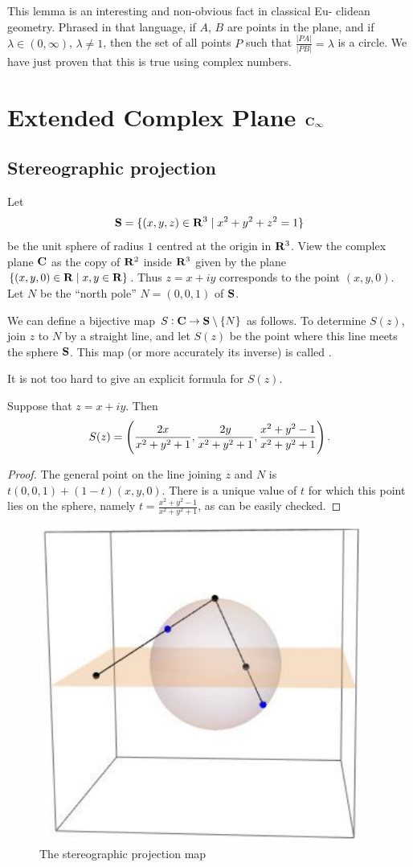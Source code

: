\begin{remark}
This lemma is an interesting and non-obvious fact in classical Eu-
clidean geometry. Phrased in that language, if $A$, $B$ are points in the plane, and if $\lambda\in(0,\infty)$, $\lambda\neq1$, then the set of all points $P$ such that $\frac{|PA|}{|PB|}=\lambda$ is a circle. We have just proven that this is true using complex numbers.
\end{remark}

\section{Extended Complex Plane $\mathbf C_\infty$}
\subsection{Stereographic projection}
Let
\[\mathbf S=\{(x,y,z)\in\mathbf R^3\mid x^2+y^2+z^2=1\}\]
be the unit sphere of radius $1$ centred at the origin in $\mathbf R^3$. View the complex plane $\mathbf C$ as the copy of $\mathbf R^2$ inside $\mathbf R^3$ given by the plane $\{(x,y,0)\in\mathbf R\mid x,y\in\mathbf R\}$. Thus $z=x+iy$ corresponds to the point $(x,y,0)$. Let $N$ be the ``north pole'' $N=(0,0,1)$ of $\mathbf S$.

We can define a bijective map $S:\mathbf C\to\mathbf S\setminus\{N\}$ as follows. To determine $S(z)$, join $z$ to $N$ by a straight line, and let $S(z)$ be the point where this line meets the sphere $\mathbf S$. This map (or more accurately its inverse) is called .

It is not too hard to give an explicit formula for $S(z)$.

\begin{lemma}
Suppose that $z=x+iy$. Then
\[S(z)=\left(\frac{2x}{x^2+y^2+1},\frac{2y}{x^2+y^2+1},\frac{x^2+y^2-1}{x^2+y^2+1}\right).\]
\end{lemma}

\begin{proof}
The general point on the line joining $z$ and $N$ is $t(0,0,1)+(1-t)(x,y,0)$. There is a unique value of $t$ for which this point lies on the sphere, namely $t=\frac{x^2+y^2-1}{x^2+y^2+1}$, as can be easily checked.
\end{proof}

\begin{figure}[H]
\centering
\includegraphics[width=0.5\linewidth]{images/stereographic-projection-map.png}
\caption{The stereographic projection map}
\end{figure}

